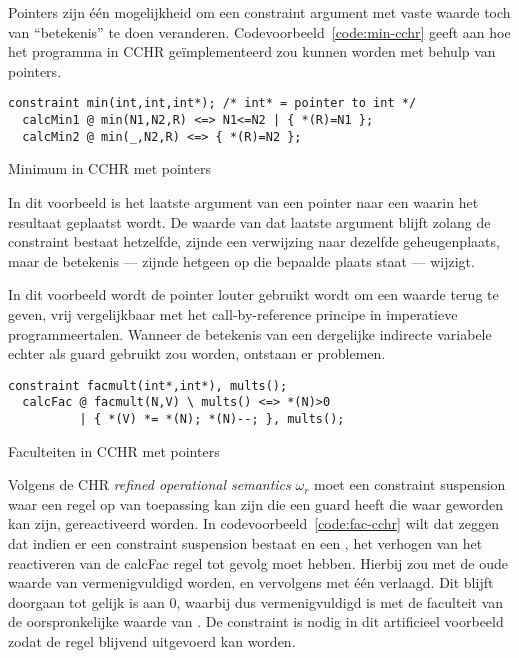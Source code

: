 Pointers zijn \'e\'en mogelijkheid om een constraint argument met vaste waarde toch van ``betekenis'' te doen veranderen. Codevoorbeeld~\ref{code:min-cchr} geeft aan hoe het  programma in CCHR ge\"implementeerd zou kunnen worden met behulp van pointers.
\begin{exCode}
\begin{Verbatim}[frame=single]
  constraint min(int,int,int*); /* int* = pointer to int */
  calcMin1 @ min(N1,N2,R) <=> N1<=N2 | { *(R)=N1 };
  calcMin2 @ min(_,N2,R) <=> { *(R)=N2 };
\end{Verbatim}
\caption{Minimum in CCHR met pointers}
\label{code:min-cchr}
\end{exCode}

In dit voorbeeld is het laatste argument van  een pointer naar een  waarin het resultaat geplaatst wordt. De waarde van dat laatste argument blijft zolang de constraint bestaat hetzelfde, zijnde een verwijzing naar dezelfde geheugenplaats, maar de betekenis --- zijnde hetgeen op die bepaalde plaats staat --- wijzigt.

In dit voorbeeld wordt de pointer louter gebruikt wordt om een waarde terug te geven, vrij vergelijkbaar met het call-by-reference principe in imperatieve programmeertalen. Wanneer de betekenis van een dergelijke indirecte variabele echter als guard gebruikt zou worden, ontstaan er problemen.
\begin{exCode}
\begin{Verbatim}[frame=single]
  constraint facmult(int*,int*), mults();
  calcFac @ facmult(N,V) \ mults() <=> *(N)>0 
          | { *(V) *= *(N); *(N)--; }, mults();
\end{Verbatim}
\caption{Faculteiten in CCHR met pointers}
\label{code:fac-cchr}
\end{exCode}
Volgens de CHR {\em refined operational semantics} $\omega_r$ moet een constraint suspension waar een regel op van toepassing kan zijn die een guard heeft die waar geworden kan zijn, gereactiveerd worden. In codevoorbeeld~\ref{code:fac-cchr} wilt dat zeggen dat indien er een  constraint suspension bestaat en een , het verhogen van  het reactiveren van de calcFac regel tot gevolg moet hebben. Hierbij zou  met de oude waarde van  vermenigvuldigd worden, en  vervolgens met \'e\'en verlaagd. Dit blijft doorgaan tot  gelijk is aan $0$, waarbij  dus vermenigvuldigd is met de faculteit van de oorspronkelijke waarde van . De  constraint is nodig in dit artificieel voorbeeld zodat de  regel blijvend uitgevoerd kan worden.

